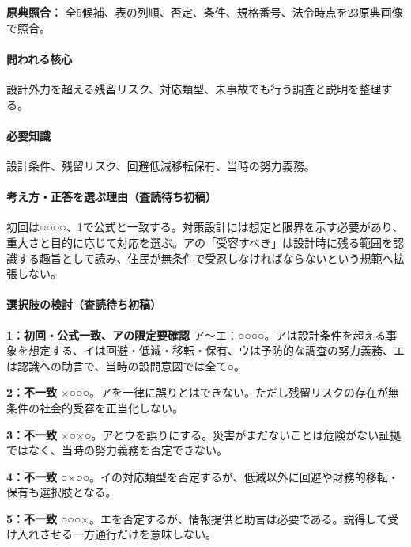 \noindent\textbf{原典照合：} 全5候補、表の列順、否定、条件、規格番号、法令時点を23原典画像で照合。\par

\paragraph{問われる核心} 設計外力を超える残留リスク、対応類型、未事故でも行う調査と説明を整理する。

\paragraph{必要知識} 設計条件、残留リスク、回避低減移転保有、当時の努力義務。

\paragraph{考え方・正答を選ぶ理由（査読待ち初稿）} 初回は○○○○、1で公式と一致する。対策設計には想定と限界を示す必要があり、重大さと目的に応じて対応を選ぶ。アの「受容すべき」は設計時に残る範囲を認識する趣旨として読み、住民が無条件で受忍しなければならないという規範へ拡張しない。

\paragraph{選択肢の検討（査読待ち初稿）}\mbox{}\par

\noindent\textbf{1：初回・公式一致、アの限定要確認} ア〜エ：○○○○。アは設計条件を超える事象を想定する、イは回避・低減・移転・保有、ウは予防的な調査の努力義務、エは認識への助言で、当時の設問意図では全て○。\par

\noindent\textbf{2：不一致} ×○○○。アを一律に誤りとはできない。ただし残留リスクの存在が無条件の社会的受容を正当化しない。\par

\noindent\textbf{3：不一致} ×○×○。アとウを誤りにする。災害がまだないことは危険がない証拠ではなく、当時の努力義務を否定できない。\par

\noindent\textbf{4：不一致} ○×○○。イの対応類型を否定するが、低減以外に回避や財務的移転・保有も選択肢となる。\par

\noindent\textbf{5：不一致} ○○○×。エを否定するが、情報提供と助言は必要である。説得して受け入れさせる一方通行だけを意味しない。\par

